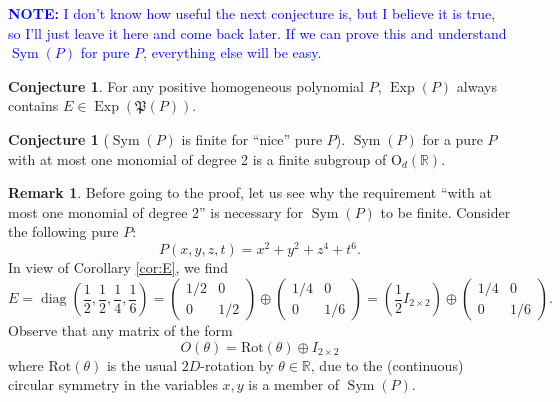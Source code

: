 \documentclass{article}
\theoremstyle{definition}
\newcommand\OdR{\mbox{O}_d(\mathbb{R})}
\newcommand\Sym{\operatorname{Sym}}
\newcommand\Exp{\operatorname{Exp}}
\newcommand\diag{\operatorname{diag}}
\newcommand{\bigzero}{\mbox{\normalfont\Large\bfseries 0}}
\newcommand{\rvline}{\hspace*{-\arraycolsep}\vline\hspace*{-\arraycolsep}}
\newcommand{\R}{\mathbb{R}}
\newcommand{\f}[2]{\frac{#1}{#2}}
\newcommand{\lp}{\left(}
\newcommand{\rp}{\right)}
\theoremstyle{theorem}
\newtheorem{conjecture}[theorem]{Conjecture}
\newtheorem{remark}{Remark}
\begin{document}
\begin{framed}
\textcolor{blue}{\textbf{NOTE:} I don't know how useful the next conjecture is, but I believe it is true, so I'll just leave it here and come back later. If we can prove this and understand $\Sym(P)$ for pure $P$, everything else will be easy.} 

\begin{conjecture}
For any positive homogeneous polynomial $P$, $\Exp(P)$ always contains $E\in \Exp(\mathfrak{P}(P))$. 
\end{conjecture}



\begin{conjecture}[$\Sym(P)$ is finite for ``nice'' pure $P$]\label{conj:SymPFinite}
$\Sym(P)$ for a pure $P$ with at most one monomial of degree 2 is a finite subgroup of $\OdR{}$.
\end{conjecture}


\begin{remark}
Before going to the proof, let us see why the requirement ``with at most one monomial of degree 2'' is necessary for $\Sym(P)$ to be finite. Consider the following pure $P$:
\begin{equation*}
    P(x,y,z,t) = x^2 + y^2 + z^4 + t^6. 
\end{equation*}
In view of Corollary \ref{cor:E}, we find 
\begin{equation*}
E = \diag{\lp \f{1}{2},\f{1}{2}, \f{1}{4},\f{1}{6} \rp} = \begin{pmatrix}
  1/2 & 0 \\0 & 1/2
\end{pmatrix} \oplus \begin{pmatrix}
  1/4 & 0\\0 & 1/6
\end{pmatrix} = \lp \f{1}{2}I_{2\times 2} \rp \oplus \begin{pmatrix}
  1/4 & 0\\0 & 1/6
\end{pmatrix}.
\end{equation*}
Observe that any matrix of the form 
\begin{equation*}
    O(\theta) = \text{Rot}(\theta) \oplus I_{2\times 2} 
\end{equation*}
where $\text{Rot}(\theta)$ is the usual $2D$-rotation by $\theta \in \R$, due to the (continuous) circular symmetry in the variables $x,y$ is a member of $\Sym(P)$.
\end{remark}


\end{framed}
\end{document}
